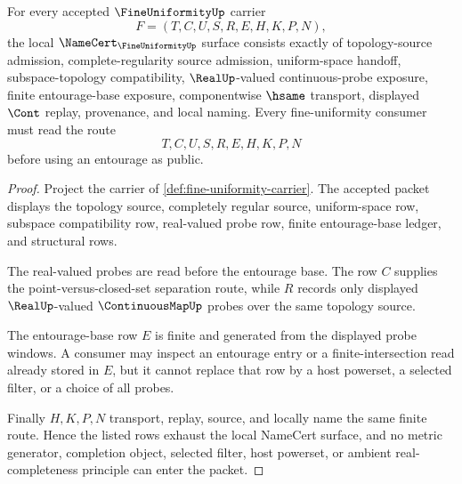 \begin{theorem}
\label{thm:fine-uniformity-namecert-obligations}
For every accepted $\FineUniformityUp$ carrier
$$
F=(T,C,U,S,R,E,H,K,P,N),
$$
the local $\NameCert_{\FineUniformityUp}$ surface consists exactly of topology-source admission, complete-regularity source admission, uniform-space handoff, subspace-topology compatibility, $\RealUp$-valued continuous-probe exposure, finite entourage-base exposure, componentwise $\hsame$ transport, displayed $\Cont$ replay, provenance, and local naming. Every fine-uniformity consumer must read the route
$$
T,C,U,S,R,E,H,K,P,N
$$
before using an entourage as public.
\end{theorem}
\begin{proof}
Project the carrier of \autoref{def:fine-uniformity-carrier}. The accepted packet displays the topology source, completely regular source, uniform-space row, subspace compatibility row, real-valued probe row, finite entourage-base ledger, and structural rows.

The real-valued probes are read before the entourage base. The row $C$ supplies the point-versus-closed-set separation route, while $R$ records only displayed $\RealUp$-valued $\ContinuousMapUp$ probes over the same topology source.

The entourage-base row $E$ is finite and generated from the displayed probe windows. A consumer may inspect an entourage entry or a finite-intersection read already stored in $E$, but it cannot replace that row by a host powerset, a selected filter, or a choice of all probes.

Finally $H,K,P,N$ transport, replay, source, and locally name the same finite route. Hence the listed rows exhaust the local NameCert surface, and no metric generator, completion object, selected filter, host powerset, or ambient real-completeness principle can enter the packet.
\end{proof}

